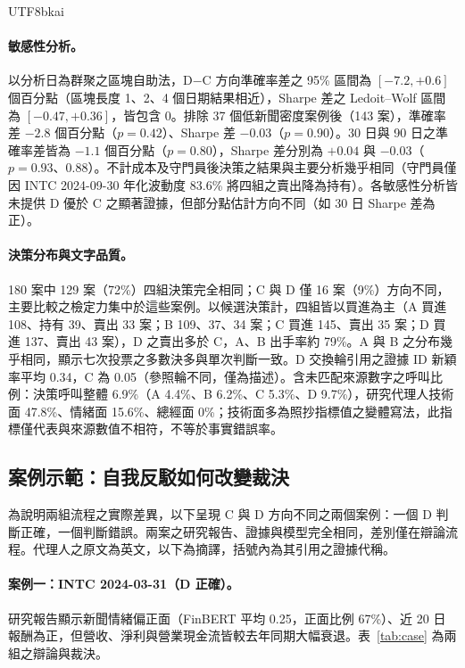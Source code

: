 \documentclass[12pt,a4paper]{article}
\newcommand{\grp}[1]{\textsf{#1}}
\begin{document}
\begin{CJK}{UTF8}{bkai}
\paragraph{敏感性分析。} 以分析日為群聚之區塊自助法，\grp{D}$-$\grp{C} 方向準確率差之 95\% 區間為 $[-7.2, +0.6]$ 個百分點（區塊長度 1、2、4 個日期結果相近），Sharpe 差之 Ledoit--Wolf 區間為 $[-0.47, +0.36]$，皆包含 0。排除 37 個低新聞密度案例後（143 案），準確率差 $-2.8$ 個百分點（$p=0.42$）、Sharpe 差 $-0.03$（$p=0.90$）。30 日與 90 日之準確率差皆為 $-1.1$ 個百分點（$p=0.80$），Sharpe 差分別為 $+0.04$ 與 $-0.03$（$p=0.93$、$0.88$）。不計成本及守門員後決策之結果與主要分析幾乎相同（守門員僅因 INTC 2024-09-30 年化波動度 83.6\% 將四組之賣出降為持有）。各敏感性分析皆未提供 \grp{D} 優於 \grp{C} 之顯著證據，但部分點估計方向不同（如 30 日 Sharpe 差為正）。

\paragraph{決策分布與文字品質。} 180 案中 129 案（72\%）四組決策完全相同；\grp{C} 與 \grp{D} 僅 16 案（9\%）方向不同，主要比較之檢定力集中於這些案例。以候選決策計，四組皆以買進為主（\grp{A} 買進 108、持有 39、賣出 33 案；\grp{B} 109、37、34 案；\grp{C} 買進 145、賣出 35 案；\grp{D} 買進 137、賣出 43 案），\grp{D} 之賣出多於 \grp{C}，\grp{A}、\grp{B} 出手率約 79\%。\grp{A} 與 \grp{B} 之分布幾乎相同，顯示七次投票之多數決多與單次判斷一致。\grp{D} 交換輪引用之證據 ID 新穎率平均 0.34，\grp{C} 為 0.05（參照輪不同，僅為描述）。含未匹配來源數字之呼叫比例：決策呼叫整體 6.9\%（\grp{A} 4.4\%、\grp{B} 6.2\%、\grp{C} 5.3\%、\grp{D} 9.7\%），研究代理人技術面 47.8\%、情緒面 15.6\%、總經面 0\%；技術面多為照抄指標值之變體寫法，此指標僅代表與來源數值不相符，不等於事實錯誤率。

\subsection{案例示範：自我反駁如何改變裁決}
\label{sec:casestudy}

為說明兩組流程之實際差異，以下呈現 \grp{C} 與 \grp{D} 方向不同之兩個案例：一個 \grp{D} 判斷正確，一個判斷錯誤。兩案之研究報告、證據與模型完全相同，差別僅在辯論流程。代理人之原文為英文，以下為摘譯，括號內為其引用之證據代稱。

\paragraph{案例一：INTC 2024-03-31（\grp{D} 正確）。} 研究報告顯示新聞情緒偏正面（FinBERT 平均 0.25，正面比例 67\%）、近 20 日報酬為正，但營收、淨利與營業現金流皆較去年同期大幅衰退。表~\ref{tab:case} 為兩組之辯論與裁決。


\end{CJK}
\end{document}
